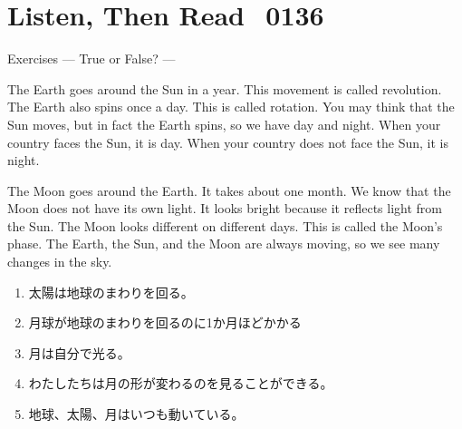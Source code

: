\documentclass[aspectratio=169,xcolor={dvipsnames,table}]{beamer}
\begin{document}
\section{Listen, Then Read\,\,\,\,\,{\tiny 0136}\,{\scriptsize {}}}
\begin{frame}[plain]{Exercises --- True or False? ---}
 \scriptsize

\vspace{-3pt}
\small
\begin{tcolorbox}[colframe=ForestGreen,
  colback=NavyBlue!10!white,
  colbacktitle=NavyBlue!40!white,
  coltitle=black, %
before upper={\setlength{\parindent}{1.25em}},
  title={次の英文を読みましょう\mbox{}\hfill{\tiny 0136}\,{\scriptsize \myaudio{./audio/054_that_clause_04.mp3}}}]
The Earth goes around the Sun in a year. This movement is called revolution.
The Earth also spins once a day. This is called rotation. You may think that the Sun moves, but in fact the Earth spins, so we have day and night. When your country faces the Sun, it is day. When your country does not face the Sun, it is night.

The Moon goes around the Earth. It takes about one month.
We know that the Moon does not have its own light. It looks bright because it reflects light from the Sun. The Moon looks different on different days. This is called the Moon's phase.
The Earth, the Sun, and the Moon are always moving, so we see many changes in the sky.
\end{tcolorbox}

\vspace{-5pt}

\begin{enumerate}\scriptsize\setlength{\itemsep}{-2pt}
 \item<2-> 太陽は地球のまわりを回る。\hfill{}
 \item<2-> 月球が地球のまわりを回るのに1か月ほどかかる\hfill{}
 \item<2-> 月は自分で光る。\hfill{}
 \item<2-> わたしたちは月の形が変わるのを見ることができる。\hfill\visible<10->{T}
 \item<2-> 地球、太陽、月はいつも動いている。\hfill{}
\end{enumerate}


\end{frame}
\end{document}
